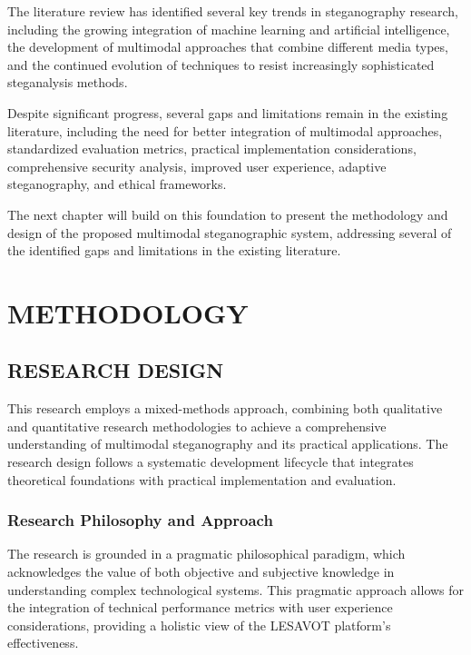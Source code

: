 \documentclass[12pt, a4paper, oneside]{book}
\begin{document}
The literature review has identified several key trends in steganography research, including the growing integration of machine learning and artificial intelligence, the development of multimodal approaches that combine different media types, and the continued evolution of techniques to resist increasingly sophisticated steganalysis methods.

Despite significant progress, several gaps and limitations remain in the existing literature, including the need for better integration of multimodal approaches, standardized evaluation metrics, practical implementation considerations, comprehensive security analysis, improved user experience, adaptive steganography, and ethical frameworks.

The next chapter will build on this foundation to present the methodology and design of the proposed multimodal steganographic system, addressing several of the identified gaps and limitations in the existing literature.

\printbibliography

\chapter{METHODOLOGY}

\section{RESEARCH DESIGN}

This research employs a mixed-methods approach, combining both qualitative and quantitative research methodologies to achieve a comprehensive understanding of multimodal steganography and its practical applications. The research design follows a systematic development lifecycle that integrates theoretical foundations with practical implementation and evaluation.

\subsection{Research Philosophy and Approach}

The research is grounded in a pragmatic philosophical paradigm, which acknowledges the value of both objective and subjective knowledge in understanding complex technological systems. This pragmatic approach allows for the integration of technical performance metrics with user experience considerations, providing a holistic view of the LESAVOT platform's effectiveness.
\end{document}
